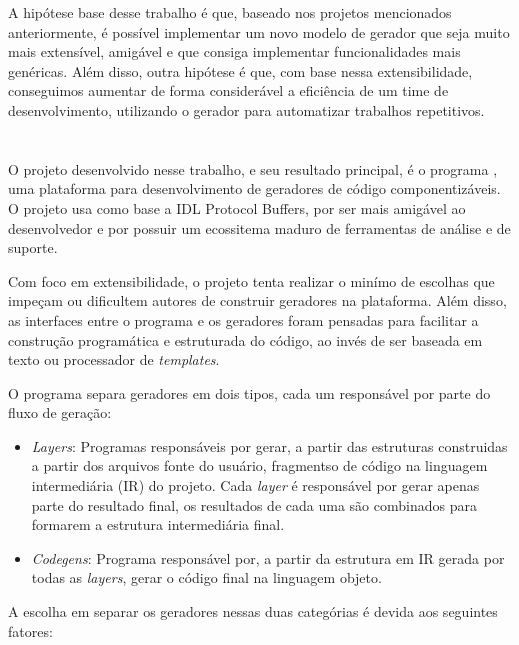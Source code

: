 A hipótese base desse trabalho é que, baseado nos projetos mencionados anteriormente,
é possível implementar um novo modelo de gerador que seja muito mais extensível, amigável
e que consiga implementar funcionalidades mais genéricas. Além disso, outra hipótese
é que, com base nessa extensibilidade, conseguimos aumentar de forma considerável a
eficiência de um time de desenvolvimento, utilizando o gerador para automatizar
trabalhos repetitivos.

\section{\Baker{}}

O projeto desenvolvido nesse trabalho, e seu resultado principal, é o programa \Baker{}
\cite{baker}, uma plataforma para desenvolvimento de geradores de código componentizáveis.
O projeto usa como base a IDL Protocol Buffers, por ser mais amigável ao desenvolvedor e
por possuir um ecossitema maduro de ferramentas de análise e de suporte.

Com foco em extensibilidade, o projeto tenta realizar o minímo de escolhas que impeçam ou
dificultem autores de construir geradores na plataforma. Além disso, as interfaces entre o
programa e os geradores foram pensadas para facilitar a construção programática e estruturada
do código, ao invés de ser baseada em texto ou processador de \textit{templates}.

O programa separa geradores em dois tipos, cada um responsável por parte do fluxo de geração:

\begin{itemize}
\item \textit{Layers}: Programas responsáveis por gerar, a partir das estruturas construidas
  a partir dos arquivos fonte do usuário, fragmentso de código na linguagem intermediária (IR)
  do projeto. Cada \textit{layer} é responsável por gerar apenas parte do resultado final, os
  resultados de cada uma são combinados para formarem a estrutura intermediária final.
\item \textit{Codegens}: Programa responsável por, a partir da estrutura em IR gerada por todas
  as \textit{layers}, gerar o código final na linguagem objeto.
\end{itemize}

A escolha em separar os geradores nessas duas categórias é devida aos seguintes fatores:

